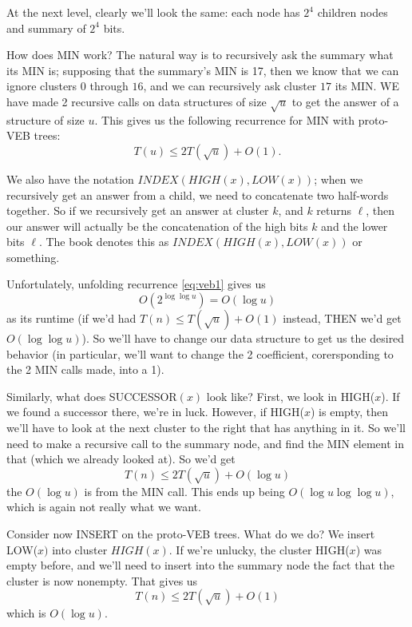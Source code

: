 \documentclass{article}
\begin{document}
At the next level, clearly we'll look the same: each node has $2^4$ children
nodes and summary of $2^4$ bits.

How does MIN work? The natural way is to recursively ask the summary
what its MIN is; supposing that the summary's MIN is 17, then we know
that we can ignore clusters $0$ through $16$, and we can recursively
ask cluster $17$ its MIN.
WE have made 2 recursive calls on data structures of size $\sqrt u$ to get
the answer of a structure of size $u$.
This gives us the following recurrence for MIN with proto-VEB trees:
\begin{equation}
T(u) \leq 2 T(\sqrt u) + O(1).
\label{eq:veb1}
\end{equation}

We also have the notation $INDEX(HIGH(x), LOW(x))$; when we recursively
get an answer from a child, we need to concatenate two half-words together.
So if we recursively get an answer at cluster $k$, and $k$ returns $\ell$, then
our answer will actually be the concatenation of the high bits $k$ and the 
lower bits $\ell$. The book denotes this as $INDEX(HIGH(x), LOW(x))$ or 
something.

Unfortulately, unfolding recurrence \eqref{eq:veb1} gives us
$$
O(2^{\log\log u}) = O(\log u)
$$
as its runtime (if we'd had $T(n) \leq T(\sqrt u) + O(1)$ instead, THEN
we'd get $O(\log\log u)$).
So we'll have to change our data structure to get us the desired behavior
(in particular, we'll want to change the 2 coefficient, corersponding
to the 2 MIN calls made, into a 1).

Similarly, what does SUCCESSOR$(x)$ look like? 
First, we look in HIGH($x$). If we found a successor there, we're in luck.
However, if HIGH($x$) is empty, then we'll have to look at the next cluster
to the right that has anything in it. So we'll need to make a recursive
call to the summary node, and find the MIN element in that (which we
already looked at).
So we'd get
\begin{equation}
T(n) \leq 2 T(\sqrt u) + O(\log u)
\end{equation}
the $O(\log u)$ is from the MIN call.
This ends up being $O(\log u \log\log u)$, which is again not really
what we want.

Consider now INSERT on the proto-VEB trees. What do we do? 
We insert LOW($x)$ into cluster $HIGH(x)$.
If we're unlucky, the cluster HIGH($x$) was empty before, and we'll
need to insert into the summary node the fact that the cluster is now
nonempty.
That gives us
$$
T(n) \leq 2 T(\sqrt u) + O(1)
$$
which is $O(\log u)$.
\end{document}
